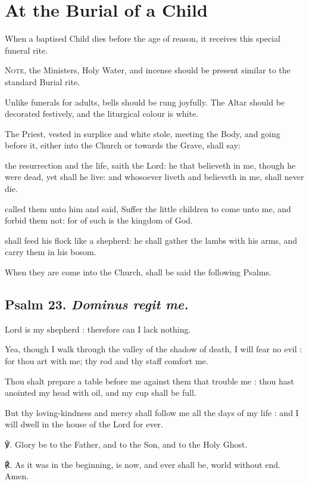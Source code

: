 \fancyhead[RE,LO]{\textit{}}
\section{At the Burial of a Child}
\begin{secrubric}
    When a baptised Child dies before the age of reason, it receives this special funeral rite.\par
    \textsc{Note,} the Ministers, Holy Water, and incense should be present similar to the standard Burial rite.
\end{secrubric}
\begin{secrubric}
    Unlike funerals for adults, bells should be rung joyfully. The Altar should be decorated festively, and the liturgical colour is white.
\end{secrubric}
\begin{secrubric}
    The Priest, vested in surplice and white stole, meeting the Body, and going before it, either into the Church or towards the Grave, shall say:
\end{secrubric}
 the resurrection and the life, saith the Lord: he that believeth in me, though he were dead, yet shall he live: and whosoever liveth and believeth in me, shall never die.

 called them unto him and said, Suffer the little children to come unto me, and forbid them not: for of such is the kingdom of God.


 shall feed his flock like a shepherd: he shall gather the lambs with his arms, and carry them in his bosom.


\begin{rubric}
    When they are come into the Church, shall be said the following Psalms.
\end{rubric}

\subsection{Psalm 23. \textit{Dominus regit me.}}
 Lord is my shepherd : therefore can I lack nothing.\par
{}
Yea, though I walk through the valley of the shadow of death, I will fear no evil : for thou art with me; thy rod and thy staff comfort me.\par
{}Thou shalt prepare a table before me against them that trouble me : thou hast anointed my head with oil, and my cup shall be full.\par
{}But thy loving-kindness and mercy shall follow me all the days of my life : and I will dwell in the house of the Lord for ever.\par
℣. Glory be to the Father, and to the Son, and to the Holy Ghost.\par
℟. As it was in the beginning, is now, and ever shall be, world without end. Amen.

